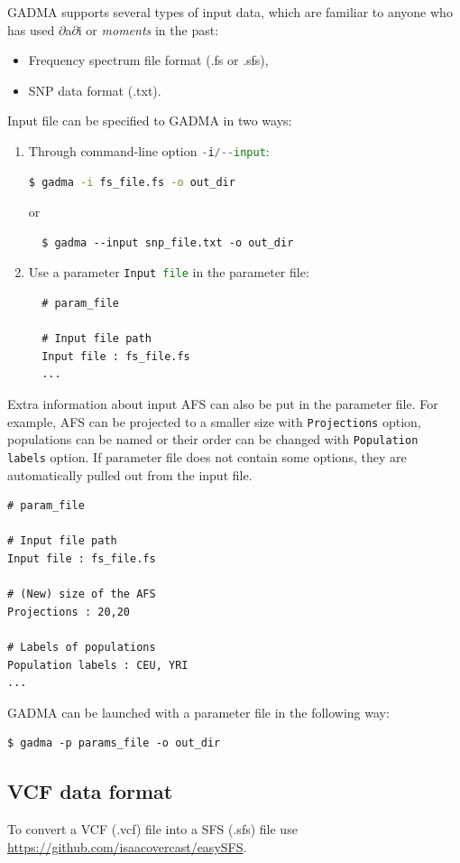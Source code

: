 \documentclass[12pt]{article}
\makeatletter
\newcommand{\dadi}{$\partial$a$\partial$i\xspace}
\newcommand{\moments}{\textit{moments}\xspace}
\newcommand{\py}[1]{\lstinline[language=Python, showstringspaces=False]@#1@}
\makeatother
\begin{document}
GADMA supports several types of input data, which are familiar to anyone who has used \dadi or \moments in the past:
\begin{itemize}
    \item Frequency spectrum file format (.fs or .sfs),
    \item SNP data format (.txt).
\end{itemize}
Input file can be specified to GADMA in two ways:

\begin{enumerate}
    \item Through command-line option \py{-i/--input}:
\begin{lstlisting}[language=bash]
  $ gadma -i fs_file.fs -o out_dir
\end{lstlisting}
  or
\begin{lstlisting}
  $ gadma --input snp_file.txt -o out_dir
\end{lstlisting}
    \item Use a parameter \py{Input file} in the parameter file:
    
  \begin{lstlisting}
  # param_file
    
  # Input file path
  Input file : fs_file.fs 
  ...
  \end{lstlisting}
\end{enumerate}    
Extra information about input AFS can also be put in the parameter file. For example, AFS can be projected to a smaller size with \py{Projections} option, populations can be named or their order can be changed with \py{Population labels} option. If parameter file does not contain some options, they are automatically pulled out from the input file.
    
\begin{lstlisting}
# param_file
    
# Input file path
Input file : fs_file.fs
    
# (New) size of the AFS
Projections : 20,20
    
# Labels of populations
Population labels : CEU, YRI
...
\end{lstlisting}
GADMA can be launched with a parameter file in the following way:
\begin{lstlisting}
$ gadma -p params_file -o out_dir
\end{lstlisting}



\subsection{VCF data format}
To convert a VCF (.vcf) file into a SFS (.sfs) file use \url{https://github.com/isaacovercast/easySFS}.
\end{document}
